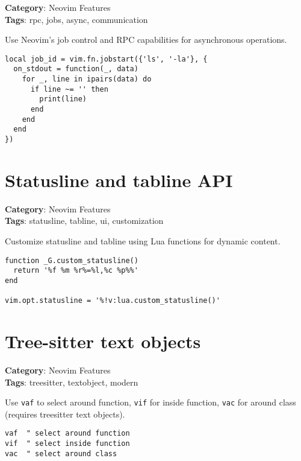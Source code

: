 {{{{{{{{{{\textbf{Category}: Neovim Features\\ \textbf{Tags}: rpc, jobs, async, communication
\vspace{0.5cm}

Use Neovim's job control and RPC capabilities for asynchronous operations.

\begin{Exa*}{}
\begin{Verbatim}[fontsize=\footnotesize, breaklines, breakanywhere]
local job_id = vim.fn.jobstart({'ls', '-la'}, {
  on_stdout = function(_, data)
    for _, line in ipairs(data) do
      if line ~= '' then
        print(line)
      end
    end
  end
})
\end{Verbatim}
\end{Exa*}

\section{Statusline and tabline API}

\textbf{Category}: Neovim Features\\ \textbf{Tags}: statusline, tabline, ui, customization
\vspace{0.5cm}

Customize statusline and tabline using Lua functions for dynamic content.

\begin{Exa*}{}
\begin{Verbatim}[fontsize=\footnotesize, breaklines, breakanywhere]
function _G.custom_statusline()
  return '%f %m %r%=%l,%c %p%%'
end

vim.opt.statusline = '%!v:lua.custom_statusline()'
\end{Verbatim}
\end{Exa*}

\section{Tree-sitter text objects}

\textbf{Category}: Neovim Features\\ \textbf{Tags}: treesitter, textobject, modern
\vspace{0.5cm}

Use {\footnotesize \Verb§vaf§} to select around function, {\footnotesize \Verb§vif§} for inside function, {\footnotesize \Verb§vac§} for around class (requires treesitter text objects).

\begin{Exa*}{}
\begin{Verbatim}[fontsize=\footnotesize, breaklines, breakanywhere]
vaf  " select around function
vif  " select inside function
vac  " select around class
\end{Verbatim}
\end{Exa*}

}}}}}}}}}}

